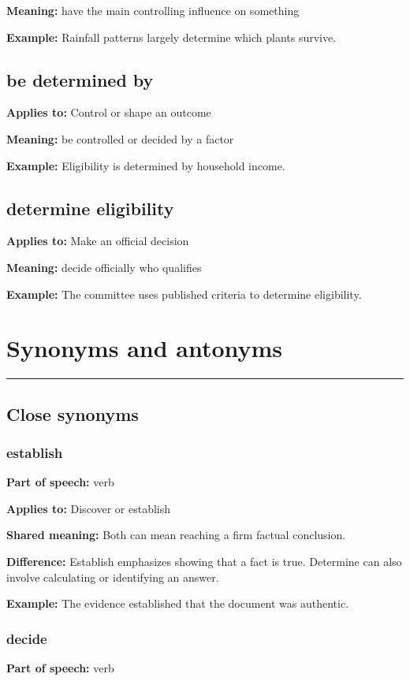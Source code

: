 \documentclass[11pt]{article}
\newcommand{\sectionrule}{\par\vspace{-0.5em}\noindent\textcolor{Accent}{\rule{\linewidth}{0.6pt}}\par}
\begin{document}
\textbf{Meaning:} have the main controlling influence on something

\textbf{Example:} Rainfall patterns largely determine which plants survive.

\subsection{be determined by}
\textbf{Applies to:} Control or shape an outcome

\textbf{Meaning:} be controlled or decided by a factor

\textbf{Example:} Eligibility is determined by household income.

\subsection{determine eligibility}
\textbf{Applies to:} Make an official decision

\textbf{Meaning:} decide officially who qualifies

\textbf{Example:} The committee uses published criteria to determine eligibility.

\section{Synonyms and antonyms}
\sectionrule
\subsection{Close synonyms}
\subsubsection{establish}
\textbf{Part of speech:} verb

\textbf{Applies to:} Discover or establish

\textbf{Shared meaning:} Both can mean reaching a firm factual conclusion.

\textbf{Difference:} Establish emphasizes showing that a fact is true. Determine can also involve calculating or identifying an answer.

\textbf{Example:} The evidence established that the document was authentic.

\subsubsection{decide}
\textbf{Part of speech:} verb
\end{document}
